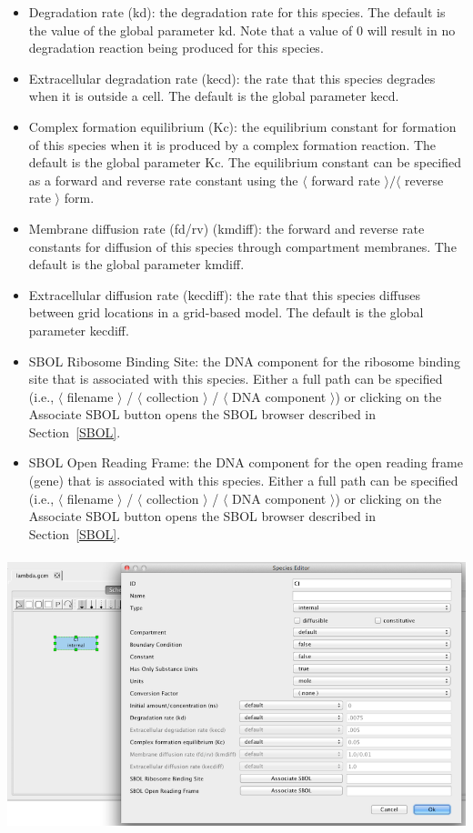 \documentclass[titlepage,11pt]{article}
\begin{document}
\begin{itemize}
\item Degradation rate (kd): the degradation rate for this species.  The default is the value of the global parameter kd.  Note that a value of 0 will result in no degradation reaction being produced for this species.
\item Extracellular degradation rate (kecd): the rate that this species degrades when it is outside a cell.  The default is the global parameter kecd.
\item Complex formation equilibrium (Kc): the equilibrium constant for formation of this species when it is produced by a complex formation reaction.  The default is the global parameter Kc.  The equilibrium constant can be specified as a forward and reverse rate constant using the $\langle$ forward rate $\rangle / \langle$ reverse rate $\rangle$ form.
\item Membrane diffusion rate (fd/rv) (kmdiff): the forward and reverse rate constants for diffusion of this species through compartment membranes.  The default is the global parameter kmdiff.
\item Extracellular diffusion rate (kecdiff): the rate that this species diffuses between grid locations in a grid-based model.  The default is the global parameter kecdiff.
\item SBOL Ribosome Binding Site: the DNA component for the ribosome binding site that is associated with this species.     Either a full path can be specified (i.e., $\langle$ filename $\rangle$ / $\langle$ collection $\rangle$ / $\langle$ DNA component $\rangle$) or clicking on the Associate SBOL button opens the SBOL browser described in Section~\ref{SBOL}.
\item SBOL Open Reading Frame: the DNA component for the open reading frame (gene) that is associated with this species.    Either a full path can be specified (i.e., $\langle$ filename $\rangle$ / $\langle$ collection $\rangle$ / $\langle$ DNA component $\rangle$) or clicking on the Associate SBOL button opens the SBOL browser described in Section~\ref{SBOL}.
\end{itemize}

\begin{center}
\includegraphics[height=80mm]{screenshots/species}
\end{center}
\end{document}
